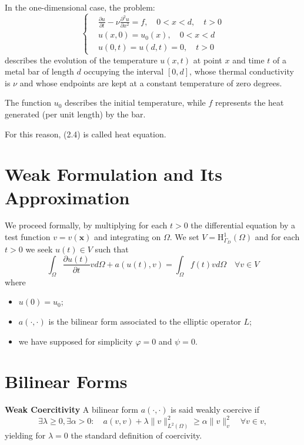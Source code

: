 \documentclass[11pt]{book}
\begin{document}
In the one-dimensional case, the problem:
\begin{equation}
\left\{
\begin{aligned}
& \frac{\partial u}{\partial t}-\nu \frac{\partial^{2} u}{\partial x^{2}}=f, \quad 0<x<d, \quad t>0 \\
& u(x, 0)=u_{0}(x), \quad 0<x<d \label{eq:central} \\
& u(0, t)=u(d, t)=0, \quad t>0
\end{aligned}
\right.
\end{equation}
describes the evolution of the temperature $u(x, t)$ at point $x$ and time $t$ of a metal bar of length $d$ occupying the interval $[0, d]$, whose thermal conductivity is $\nu$ and whose endpoints are kept at a constant temperature of zero degrees.

The function $u_{0}$ describes the initial temperature, while $f$ represents the heat generated (per unit length) by the bar.

For this reason, (2.4) is called heat equation.

\section*{Weak Formulation and Its Approximation}
We proceed formally, by multiplying for each $t>0$ the differential equation by a test function $v=v(\mathbf{x})$ and integrating on $\Omega$. We set $V=\mathrm{H}_{\Gamma_{D}}^{1}(\Omega)$ and for each $t>0$ we seek $u(t) \in V$ such that
\begin{equation}
\int_{\Omega} \frac{\partial u(t)}{\partial t} v d \Omega+a(u(t), v)=\int_{\Omega} f(t) v d \Omega \quad \forall v \in V
\end{equation}
where
\begin{itemize}
\item $u(0) =u_{0}$;
\item $a(\cdot, \cdot)$ is the bilinear form associated to the elliptic operator $L$;
\item we have supposed for simplicity $\varphi=0$ and $\psi=0$.
\end{itemize}


\section{Bilinear Forms}
\textbf{Weak Coercitivity}
A bilinear form $a(\cdot, \cdot)$ is said weakly coercive if
$$
\exists \lambda \geq 0, \exists \alpha>0: \quad a(v, v)+\lambda\|v\|_{L^2(\Omega)}^2 \geq \alpha\|v\|_v^2 \quad \forall v \in v,
$$
yielding for $\lambda=0$ the standard definition of coercivity. 
\end{document}
